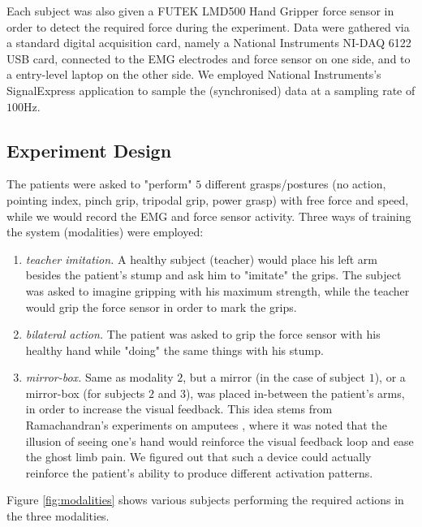 Each subject was also given a FUTEK LMD500 Hand Gripper force sensor
\cite{futek} in order to detect the required force during the
experiment. Data were gathered via a standard digital acquisition
card, namely a National Instruments NI-DAQ 6122 USB card, connected to
the EMG electrodes and force sensor on one side, and to a entry-level
laptop on the other side. We employed National Instruments's
SignalExpress application to sample the (synchronised) data at a
sampling rate of $100$Hz.

\subsection{Experiment Design}

The patients were asked to "perform" $5$ different grasps/postures (no
action, pointing index, pinch grip, tripodal grip, power grasp) with
free force and speed, while we would record the EMG and force sensor
activity. Three ways of training the system (modalities) were
employed:

\begin{enumerate}
  \item \emph{teacher imitation.} A healthy subject (teacher) would
    place his left arm besides the patient's stump and ask him to
    "imitate" the grips. The subject was asked to imagine gripping
    with his maximum strength, while the teacher would grip the force
    sensor in order to mark the grips.

  \item \emph{bilateral action.} The patient was asked to grip the
    force sensor with his healthy hand while "doing" the same things
    with his stump.

  \item \emph{mirror-box.} Same as modality $2$, but a mirror (in the
    case of subject $1$), or a mirror-box (for subjects $2$ and $3$),
    was placed in-between the patient's arms, in order to increase the
    visual feedback. This idea stems from Ramachandran's experiments
    on amputees \cite{ramachandran}, where it was noted that the
    illusion of seeing one's hand would reinforce the visual feedback
    loop and ease the ghost limb pain. We figured out that such a
    device could actually reinforce the patient's ability to produce
    different activation patterns.

\end{enumerate}

Figure \ref{fig:modalities} shows various subjects performing the
required actions in the three modalities.

